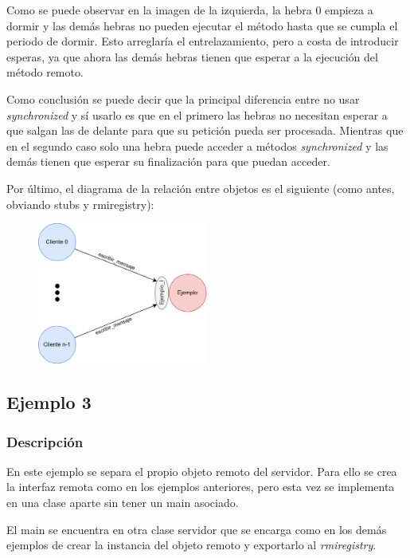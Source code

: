 \documentclass{article}
\begin{document}
Como se puede observar en la imagen de la izquierda, la hebra 0 empieza a dormir y las demás hebras no pueden ejecutar el método hasta que se cumpla el periodo de dormir. Esto arreglaría el entrelazamiento, pero a costa de introducir esperas, ya que ahora las demás hebras tienen que esperar a la ejecución del método remoto.

\bigskip

Como conclusión se puede decir que la principal diferencia entre no usar \textit{synchronized} y sí usarlo es que en el primero las hebras no necesitan esperar a que salgan las de delante para que su petición pueda ser procesada. Mientras que en el segundo caso solo una hebra puede acceder a métodos \textit{synchronized} y las demás tienen que esperar su finalización para que puedan acceder.

\bigskip

Por último, el diagrama de la relación entre objetos es el siguiente (como antes, obviando stubs y rmiregistry):

\begin{figure}[H]
    \centering
    \includegraphics[width=0.5\textwidth]{imagenes/E2Diagrama.png}
\end{figure}

\subsection{Ejemplo 3}
\subsubsection{Descripción}
En este ejemplo se separa el propio objeto remoto del servidor. Para ello se crea la interfaz remota como en los ejemplos anteriores, pero esta vez se implementa en una clase aparte sin tener un main asociado.

El main se encuentra en otra clase servidor que se encarga como en los demás ejemplos de crear la instancia del objeto remoto y exportarlo al \textit{rmiregistry}.
\end{document}
